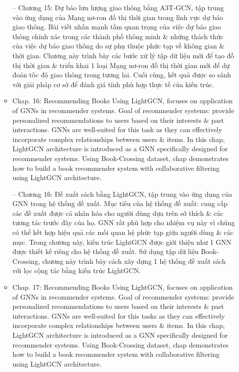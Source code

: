 \documentclass{article}
\begin{document}
\begin{itemize}
\begin{itemize}
        -- Chương 15: Dự báo lưu lượng giao thông bằng A3T-GCN, tập trung vào ứng dụng của Mạng nơ-ron đồ thị thời gian trong lĩnh vực dự báo giao thông. Bài viết nhấn mạnh tầm quan trọng của việc dự báo giao thông chính xác trong các thành phố thông minh \& những thách thức của việc dự báo giao thông do sự phụ thuộc phức tạp về không gian \& thời gian. Chương này trình bày các bước xử lý tập dữ liệu mới để tạo đồ thị thời gian \& triển khai 1 loại Mạng nơ-ron đồ thị thời gian mới để dự đoán tốc độ giao thông trong tương lai. Cuối cùng, kết quả được so sánh với giải pháp cơ sở để đánh giá tính phù hợp thực tế của kiến trúc.
        \item Chap. 16: Recommending Books Using LightGCN, focuses on application of GNNs in recommender systems. Goal of recommender systems: provide personalized recommendations to users based on their interests \& past interactions. GNNs are well-suited for this task as they can effectively incorporate complex relationships between users \& items. In this chap, LightGCN architecture is introduced as a GNN specifically designed for recommender systems. Using Book-Crossing dataset, chap demonstrates how to build a book recommender system with collaborative filtering using LightGCN architecture.

        -- Chương 16: Đề xuất sách bằng LightGCN, tập trung vào ứng dụng của GNN trong hệ thống đề xuất. Mục tiêu của hệ thống đề xuất: cung cấp các đề xuất được cá nhân hóa cho người dùng dựa trên sở thích \& các tương tác trước đây của họ. GNN rất phù hợp cho nhiệm vụ này vì chúng có thể kết hợp hiệu quả các mối quan hệ phức tạp giữa người dùng \& các mục. Trong chương này, kiến trúc LightGCN được giới thiệu như 1 GNN được thiết kế riêng cho hệ thống đề xuất. Sử dụng tập dữ liệu Book-Crossing, chương này trình bày cách xây dựng 1 hệ thống đề xuất sách với lọc cộng tác bằng kiến trúc LightGCN.
        \item Chap. 17: Recommending Books Using LightGCN, focuses on application of GNNs in recommender systems. Goal of recommender systems: provide personalized recommendations to users based on their interests \& past interactions. GNNs are well-suited for this tasks as they can effectively incorporate complex relationships between users \& items. In this chap, LightGCN architecture is introduced as a GNN specifically designed for recommender systems. Using Book-Crossing dataset, chap demonstrates how to build a book recommender system with collaborative filtering using LightGCN architecture.


\end{itemize}
\end{itemize}
\end{document}
